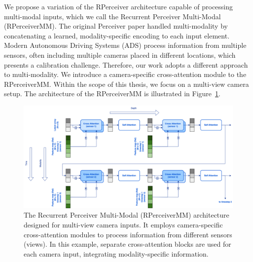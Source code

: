
We propose a variation of the RPerceiver architecture capable of processing multi-modal inputs, which we call the Recurrent Perceiver Multi-Modal (RPerceiverMM). The original Perceiver paper \cite{jaeglePerceiverGeneralPerception2021} handled multi-modality by concatenating a learned, modality-specific encoding to each input element. Modern Autonomous Driving Systems (ADS) process information from multiple sensors, often including multiple cameras placed in different locations, which presents a calibration challenge. Therefore, our work adopts a different approach to multi-modality. We introduce a camera-specific cross-attention module to the RPerceiverMM. Within the scope of this thesis, we focus on a multi-view camera setup. The architecture of the RPerceiverMM is illustrated in Figure~\ref{fig:figure_methods_recurrent_perceiver_mm}.


\begin{figure}
    \centering
    \includegraphics[width=\textwidth]{figures/figure_methods_recurrent_perceiver_mm.png}
    \caption{The Recurrent Perceiver Multi-Modal (RPerceiverMM) architecture designed for multi-view camera inputs. It employs camera-specific cross-attention modules to process information from different sensors (views). In this example, separate cross-attention blocks are used for each camera input, integrating modality-specific information.}
    \label{fig:figure_methods_recurrent_perceiver_mm}
\end{figure}

